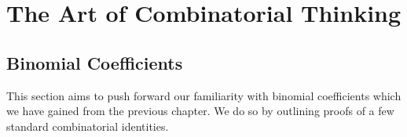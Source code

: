 \chapter{The Art of Combinatorial Thinking}
\section{Binomial Coefficients}
This section aims to push forward our familiarity with binomial coefficients which we have gained from the previous chapter. We do so by outlining proofs of a few standard combinatorial identities.

